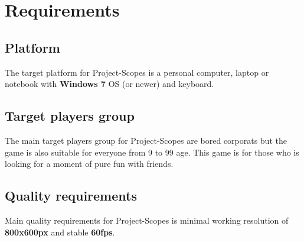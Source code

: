 \section{Requirements}

\subsection{Platform}
\noindent The target platform for Project-Scopes is a personal computer, laptop or notebook with \textbf{Windows 7} OS (or newer) and keyboard.
\subsection{Target players group}
\noindent The main target players group for Project-Scopes are bored corporats but the game is also suitable for everyone from 9 to 99 age. This game is for those who is looking for a moment of pure fun with friends. 
\subsection{Quality requirements}
\noindent Main quality requirements for Project-Scopes is minimal working resolution of \textbf{800x600px} and stable \textbf{60fps}.